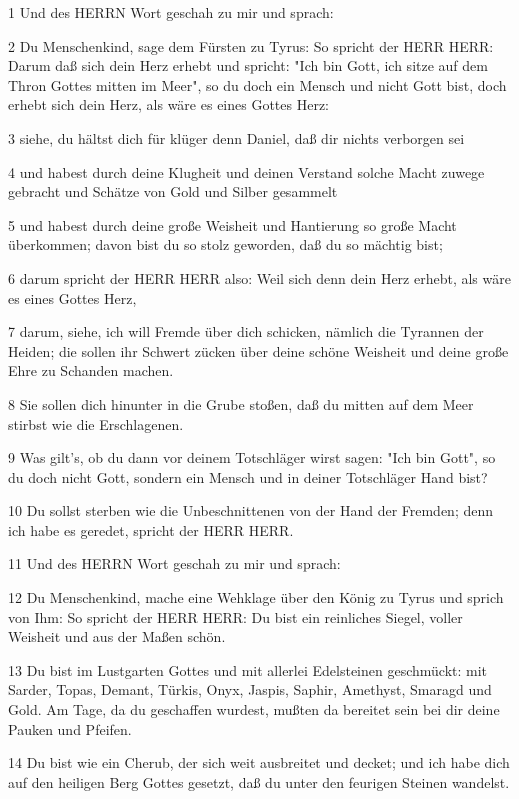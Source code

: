 \par 1 Und des HERRN Wort geschah zu mir und sprach:
\par 2 Du Menschenkind, sage dem Fürsten zu Tyrus: So spricht der HERR HERR: Darum daß sich dein Herz erhebt und spricht: "Ich bin Gott, ich sitze auf dem Thron Gottes mitten im Meer", so du doch ein Mensch und nicht Gott bist, doch erhebt sich dein Herz, als wäre es eines Gottes Herz:
\par 3 siehe, du hältst dich für klüger denn Daniel, daß dir nichts verborgen sei
\par 4 und habest durch deine Klugheit und deinen Verstand solche Macht zuwege gebracht und Schätze von Gold und Silber gesammelt
\par 5 und habest durch deine große Weisheit und Hantierung so große Macht überkommen; davon bist du so stolz geworden, daß du so mächtig bist;
\par 6 darum spricht der HERR HERR also: Weil sich denn dein Herz erhebt, als wäre es eines Gottes Herz,
\par 7 darum, siehe, ich will Fremde über dich schicken, nämlich die Tyrannen der Heiden; die sollen ihr Schwert zücken über deine schöne Weisheit und deine große Ehre zu Schanden machen.
\par 8 Sie sollen dich hinunter in die Grube stoßen, daß du mitten auf dem Meer stirbst wie die Erschlagenen.
\par 9 Was gilt's, ob du dann vor deinem Totschläger wirst sagen: "Ich bin Gott", so du doch nicht Gott, sondern ein Mensch und in deiner Totschläger Hand bist?
\par 10 Du sollst sterben wie die Unbeschnittenen von der Hand der Fremden; denn ich habe es geredet, spricht der HERR HERR.
\par 11 Und des HERRN Wort geschah zu mir und sprach:
\par 12 Du Menschenkind, mache eine Wehklage über den König zu Tyrus und sprich von Ihm: So spricht der HERR HERR: Du bist ein reinliches Siegel, voller Weisheit und aus der Maßen schön.
\par 13 Du bist im Lustgarten Gottes und mit allerlei Edelsteinen geschmückt: mit Sarder, Topas, Demant, Türkis, Onyx, Jaspis, Saphir, Amethyst, Smaragd und Gold. Am Tage, da du geschaffen wurdest, mußten da bereitet sein bei dir deine Pauken und Pfeifen.
\par 14 Du bist wie ein Cherub, der sich weit ausbreitet und decket; und ich habe dich auf den heiligen Berg Gottes gesetzt, daß du unter den feurigen Steinen wandelst.
